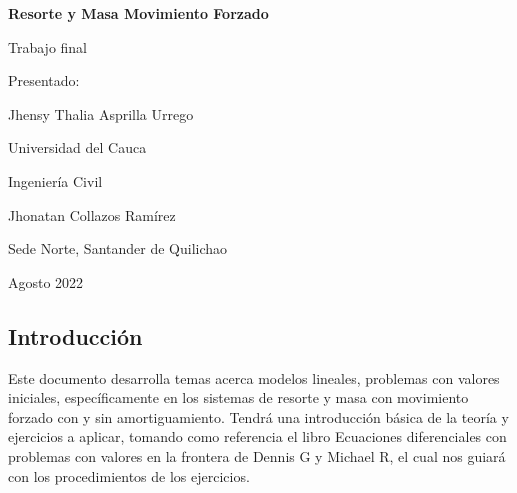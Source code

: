 \documentclass[12pt,a4paper]{article}
\begin{document}
\begin{titlepage}
\centering

{\bfseries\LARGE Resorte y Masa Movimiento Forzado \par}
\vspace{1cm}
{\Large Trabajo final \par}
\vfill
{\Large Presentado: \par}
\vspace{0.5cm}
{\Large Jhensy Thalia Asprilla Urrego \par}
\vfill
{\Large Universidad del Cauca \par}
\vspace{0.5cm}
{\Large Ingeniería Civil  \par}
\vspace{0.5cm}
{\Large Jhonatan Collazos Ramírez  \par}
\vfill
{\Large Sede Norte, Santander de Quilichao  \par}
\vspace{0.5cm}
{\Large Agosto 2022 \par}
\end{titlepage}
		
	\newpage 
	\begin{center}
	\tableofcontents %
	\end{center}
	
	\newpage
	\begin{center}
	\section*{Introducción}
	\end{center}
	\vspace{1cm}
	Este documento desarrolla temas acerca modelos lineales, problemas con valores iniciales, específicamente en los sistemas de resorte y masa con movimiento forzado con y sin amortiguamiento. Tendrá una introducción básica de la teoría y ejercicios a aplicar, tomando como referencia el libro Ecuaciones diferenciales con problemas con valores en la frontera de Dennis G y Michael R, el cual nos guiará con los procedimientos de los ejercicios.\cite{01}
	
\end{document}

